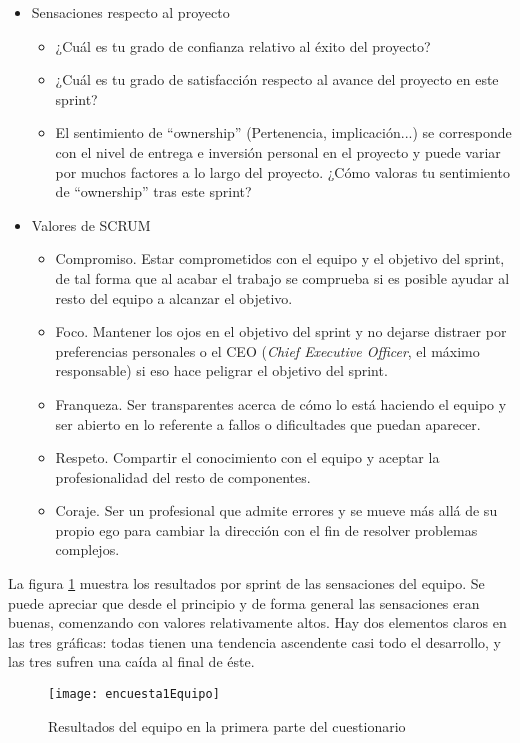 \begin{itemize}
\item Sensaciones respecto al proyecto
	\begin{itemize}
		\item ¿Cuál es tu grado de confianza relativo al éxito del proyecto?
		\item ¿Cuál es tu grado de satisfacción respecto al avance del proyecto en este sprint?
		\item El sentimiento de ``ownership'' (Pertenencia, implicación...) se corresponde con el nivel de entrega e inversión personal en el proyecto y puede variar 			por muchos factores a lo largo del proyecto. ¿Cómo valoras tu sentimiento de ``ownership'' tras este sprint?
	\end{itemize}
	\item Valores de SCRUM
	\begin{itemize}
		\item Compromiso. Estar comprometidos con el equipo y el objetivo del sprint, de tal forma que al acabar el trabajo se comprueba si es posible ayudar al resto 			del equipo a alcanzar el objetivo.
		\item Foco. Mantener los ojos en el objetivo del sprint y no dejarse distraer por preferencias personales o el CEO (\emph{Chief Executive Officer}, el máximo 					responsable) si eso hace peligrar el objetivo del sprint.
		\item Franqueza. Ser transparentes acerca de cómo lo está haciendo el equipo y ser abierto en lo referente a fallos o dificultades que puedan aparecer.
		\item Respeto. Compartir el conocimiento con el equipo y aceptar la profesionalidad del resto de componentes.
		\item Coraje. Ser un profesional que admite errores y se mueve más allá de su propio ego para cambiar la dirección con el fin de resolver problemas complejos.
	\end{itemize}
\end{itemize}




La figura \ref{fig:encuesta1Equipo} muestra los resultados por sprint de las sensaciones del equipo. Se puede apreciar que desde el principio y de forma general las sensaciones eran buenas, comenzando con valores relativamente altos. Hay dos elementos claros en las tres gráficas: todas tienen una tendencia ascendente casi todo el desarrollo, y las tres sufren una caída al final de éste. 

\begin{figure}[!h]
\begin{center}
\texttt{[image: encuesta1Equipo]}
\caption{Resultados del equipo en la primera parte del cuestionario}
\label{fig:encuesta1Equipo}
\end{center}
\end{figure}

